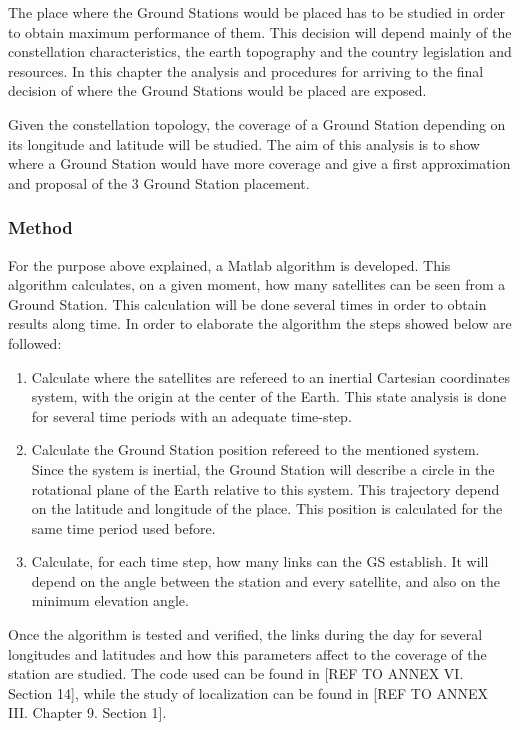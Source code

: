 The place where the Ground Stations would be placed has to be studied in order to obtain maximum performance of them. This decision will depend mainly of the constellation characteristics, the earth topography and the country legislation and resources. In this chapter the analysis and procedures for arriving to the final decision of where the Ground Stations would be placed are exposed.

Given the constellation topology, the coverage of a Ground Station depending on its longitude and latitude will be studied. The aim of this analysis is to show where a Ground Station would have more coverage and give a first approximation and proposal of the 3 Ground Station placement.

\subsubsection{Method}
For the purpose above explained, a Matlab algorithm is developed. This algorithm calculates, on a given moment, how many satellites can be seen from a Ground Station. This calculation will be done several times in order to obtain results along time. In order to elaborate the algorithm the steps showed below are followed:
\begin{enumerate}
\item Calculate where the satellites are refereed to an inertial Cartesian coordinates system, with the origin at the center of the Earth. This state analysis is done for several time periods with an adequate time-step. 
\item Calculate the Ground Station position refereed to the mentioned system. Since the system is inertial, the Ground Station will describe a circle in the rotational plane of the Earth relative to this system. This trajectory depend on the latitude and longitude of the place. This position is calculated for the same time period used before.
\item Calculate, for each time step, how many links can the GS establish. It will depend on the angle between the station and every satellite, and also on the minimum elevation angle. 
\end{enumerate}

Once the algorithm is tested and verified, the links during the day for several longitudes and latitudes and how this parameters affect to the coverage of the station are studied. The code used can be found in [{REF TO ANNEX VI. Section 14}], while the study of localization can be found in [{REF TO ANNEX III. Chapter 9. Section 1}].

